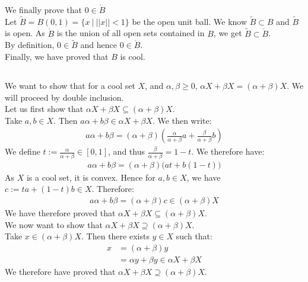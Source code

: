 \documentclass{article}
\begin{document}
\noindent We finally prove that $0 \in \mathring{B}$ \\
Let $\widetilde{B}=B(0,1) = \{x \ | \  ||x|| < 1 \}$ be the open unit ball. We know $\widetilde{B} \subset B$ and $\widetilde{B}$ is open. As $\mathring{B}$ is the union of all open sets contained in $B$, we get $\widetilde{B} \subset \mathring{B}$. \\
By definition, $0 \in \widetilde{B}$ and hence $0 \in \mathring{B}$. \\

\noindent Finally, we have proved that $B$ is cool. \\



\subsection{}%
We want to show that for a cool set $X$, and $\alpha,\beta \geq 0, \, \alpha X + \beta X = (\alpha + \beta )X$. We will proceed by double inclusion.\\

\noindent Let us first show that $\alpha X + \beta X \subseteq (\alpha + \beta )X$. \\
Take $a,b \in X$. Then $a\alpha + b\beta \in  \alpha X + \beta X$. We then write:
\begin{align*}
	a\alpha + b\beta = (\alpha + \beta )\left( \frac{\alpha}{\alpha + \beta}a +  \frac{\beta}{\alpha + \beta}b \right)
\end{align*}
We define $t := \frac{\alpha}{\alpha + \beta} \in [0,1]$, and thus $\frac{\beta}{\alpha + \beta} = 1-t$. We therefore have:
\begin{align*}
	a\alpha + b\beta = (\alpha + \beta )\big(at + b(1-t)\big)
\end{align*}
As $X$ is a cool set, it is convex. Hence for $a,b \in X$, we have $c:=ta + (1-t)b \in X$. Therefore:
\begin{align*}
	a\alpha + b\beta = (\alpha + \beta )c \in (\alpha + \beta )X
\end{align*}
We have therefore proved that $\alpha X + \beta X \subseteq (\alpha + \beta )X$.\\

\noindent We now want to show that $\alpha X + \beta X \supseteq (\alpha + \beta )X$.\\ 
Take $x \in (\alpha + \beta )X$. Then there exists $y \in X$ such that:
\begin{align*}
	x &= (\alpha + \beta )y\\
	&= \alpha y + \beta y \in \alpha X + \beta X
\end{align*}
We therefore have proved that $\alpha X + \beta X \supseteq (\alpha + \beta )X$.\\ 
\end{document}

